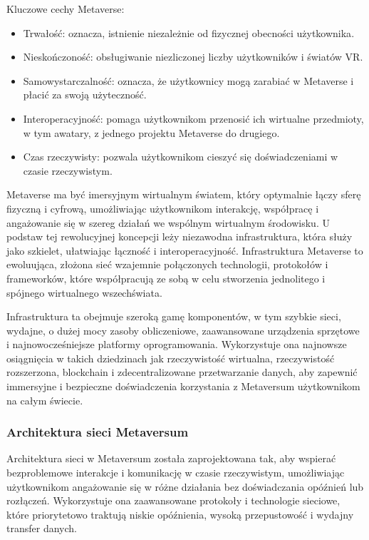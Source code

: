 Kluczowe cechy Metaverse:

\begin{itemize}
    \item Trwałość:  oznacza, istnienie niezależnie od fizycznej obecności użytkownika\cite{metaverseAFullDive}.
    \item Nieskończoność: obsługiwanie niezliczonej liczby użytkowników i światów VR\cite{metaverseAFullDive}.
    \item Samowystarczalność: oznacza, że użytkownicy mogą zarabiać w Metaverse i płacić za swoją użyteczność\cite{metaverseAFullDive}.
    \item Interoperacyjność: pomaga użytkownikom przenosić ich wirtualne przedmioty, w tym awatary, z jednego projektu Metaverse do drugiego\cite{metaverseAFullDive}.
    \item Czas rzeczywisty: pozwala użytkownikom cieszyć się doświadczeniami w czasie rzeczywistym\cite{metaverseAFullDive}.
\end{itemize}


Metaverse ma być imersyjnym wirtualnym światem, który optymalnie łączy sferę fizyczną i cyfrową, umożliwiając użytkownikom interakcję, współpracę i angażowanie się w szereg działań we wspólnym wirtualnym środowisku. U podstaw tej rewolucyjnej koncepcji leży niezawodna infrastruktura, która służy jako szkielet, ułatwiając łączność i interoperacyjność. Infrastruktura Metaverse to ewoluująca, złożona sieć wzajemnie połączonych technologii, protokołów i frameworków, które współpracują ze sobą w celu stworzenia jednolitego i spójnego wirtualnego wszechświata\cite{metaverseInfrastructureIEEE}.

Infrastruktura ta obejmuje szeroką gamę komponentów, w tym szybkie sieci, wydajne, o dużej mocy zasoby obliczeniowe, zaawansowane urządzenia sprzętowe i najnowocześniejsze platformy oprogramowania. Wykorzystuje ona najnowsze osiągnięcia w takich dziedzinach jak rzeczywistość wirtualna, rzeczywistość rozszerzona, blockchain i zdecentralizowane przetwarzanie danych, aby zapewnić immersyjne i bezpieczne doświadczenia korzystania z Metaversum użytkownikom na całym świecie\cite{metaverseInfrastructureIEEE}.

\subsubsection{Architektura sieci Metaversum}

Architektura sieci w Metaversum została zaprojektowana tak, aby wspierać bezproblemowe interakcje i komunikację w czasie rzeczywistym, umożliwiając użytkownikom angażowanie się w różne działania bez doświadczania opóźnień lub rozłączeń. Wykorzystuje ona zaawansowane protokoły i technologie sieciowe, które priorytetowo traktują niskie opóźnienia, wysoką przepustowość i wydajny transfer danych\cite{metaverseInfrastructureIEEE}.

